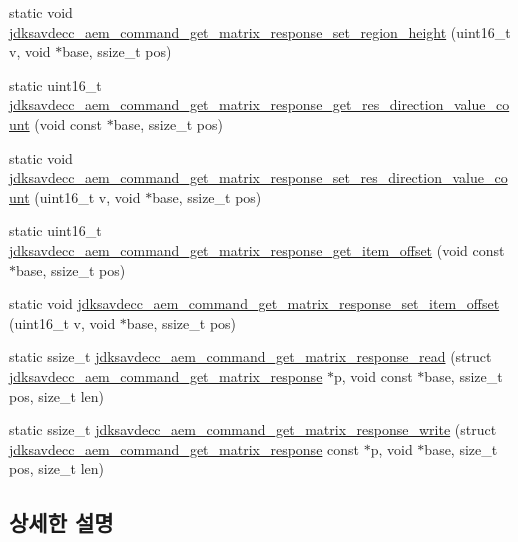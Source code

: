 \begin{DoxyCompactItemize}
\item 
static void \hyperlink{group__command__get__matrix__response_ga567114d5982537c21f3248a7332de0d1}{jdksavdecc\+\_\+aem\+\_\+command\+\_\+get\+\_\+matrix\+\_\+response\+\_\+set\+\_\+region\+\_\+height} (uint16\+\_\+t v, void $\ast$base, ssize\+\_\+t pos)
\item 
static uint16\+\_\+t \hyperlink{group__command__get__matrix__response_gae9929f796cbb4ca114ff2662cdc62164}{jdksavdecc\+\_\+aem\+\_\+command\+\_\+get\+\_\+matrix\+\_\+response\+\_\+get\+\_\+res\+\_\+direction\+\_\+value\+\_\+count} (void const $\ast$base, ssize\+\_\+t pos)
\item 
static void \hyperlink{group__command__get__matrix__response_ga22f5abaa9b2eb23ecfef424496a9c15c}{jdksavdecc\+\_\+aem\+\_\+command\+\_\+get\+\_\+matrix\+\_\+response\+\_\+set\+\_\+res\+\_\+direction\+\_\+value\+\_\+count} (uint16\+\_\+t v, void $\ast$base, ssize\+\_\+t pos)
\item 
static uint16\+\_\+t \hyperlink{group__command__get__matrix__response_gabd0400fc6df0ec7b7e1b417a86678c46}{jdksavdecc\+\_\+aem\+\_\+command\+\_\+get\+\_\+matrix\+\_\+response\+\_\+get\+\_\+item\+\_\+offset} (void const $\ast$base, ssize\+\_\+t pos)
\item 
static void \hyperlink{group__command__get__matrix__response_gad0927d3215b7128c7a9cfd34b94a89f7}{jdksavdecc\+\_\+aem\+\_\+command\+\_\+get\+\_\+matrix\+\_\+response\+\_\+set\+\_\+item\+\_\+offset} (uint16\+\_\+t v, void $\ast$base, ssize\+\_\+t pos)
\item 
static ssize\+\_\+t \hyperlink{group__command__get__matrix__response_ga3abbaa14211773e2833a625a0a28bec0}{jdksavdecc\+\_\+aem\+\_\+command\+\_\+get\+\_\+matrix\+\_\+response\+\_\+read} (struct \hyperlink{structjdksavdecc__aem__command__get__matrix__response}{jdksavdecc\+\_\+aem\+\_\+command\+\_\+get\+\_\+matrix\+\_\+response} $\ast$p, void const $\ast$base, ssize\+\_\+t pos, size\+\_\+t len)
\item 
static ssize\+\_\+t \hyperlink{group__command__get__matrix__response_ga90dcbcc647c6280fd0b1e49ce457127c}{jdksavdecc\+\_\+aem\+\_\+command\+\_\+get\+\_\+matrix\+\_\+response\+\_\+write} (struct \hyperlink{structjdksavdecc__aem__command__get__matrix__response}{jdksavdecc\+\_\+aem\+\_\+command\+\_\+get\+\_\+matrix\+\_\+response} const $\ast$p, void $\ast$base, size\+\_\+t pos, size\+\_\+t len)
\end{DoxyCompactItemize}


\subsection{상세한 설명}


